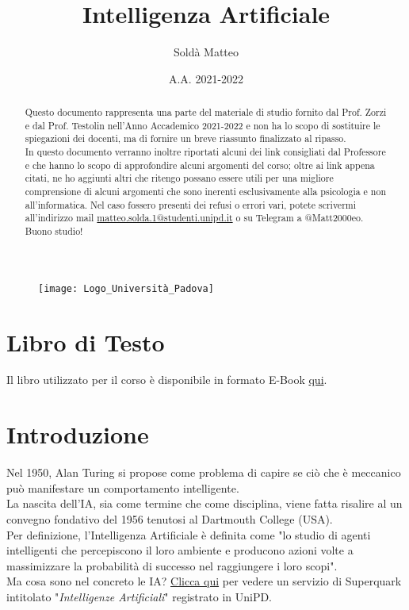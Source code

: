 \documentclass[12pt, a4paper]{article}
\title{Intelligenza Artificiale}
\author{Soldà Matteo }
\date{A.A. 2021-2022}
\begin{document}
\begin{figure}
    \centering
    \texttt{[image: Logo\_Università\_Padova]}
\end{figure}

\maketitle

\newpage
\begin{abstract}
    Questo documento rappresenta una parte del materiale di studio fornito dal Prof. Zorzi e dal Prof. Testolin nell'Anno Accademico 2021-2022 e non ha lo scopo di sostituire le spiegazioni dei docenti, ma di fornire un breve riassunto finalizzato al ripasso.\\ In questo documento verranno inoltre riportati alcuni dei link consigliati dal Professore e che hanno lo scopo di approfondire alcuni argomenti del corso; oltre ai link appena citati, ne ho aggiunti altri che ritengo possano essere utili per una migliore comprensione di alcuni argomenti che sono inerenti esclusivamente alla psicologia e non all'informatica.
    Nel caso fossero presenti dei refusi o errori vari, potete scrivermi all'indirizzo mail \href{mailto:matteo.solda.1@studenti.unipd.it}{matteo.solda.1@studenti.unipd.it} o su Telegram a @Matt2000eo.\\
    Buono studio!
\end{abstract}

\newpage
\tableofcontents

\newpage
\section{Libro di Testo}
Il libro utilizzato per il corso è disponibile in formato E-Book \href{https://infoscience.epfl.ch/record/63947}{qui}.

\section{Introduzione}
Nel 1950, Alan Turing si propose come problema di capire se ciò che è meccanico può manifestare un comportamento intelligente.\\
La nascita dell'IA, sia come termine che come disciplina, viene fatta risalire al un convegno fondativo del 1956 tenutosi al Dartmouth College (USA).\\
Per definizione, l'Intelligenza Artificiale è definita come "lo studio di agenti intelligenti che percepiscono il loro ambiente e producono azioni volte a massimizzare la probabilità di successo nel raggiungere i loro scopi". \\
Ma cosa sono nel concreto le IA? \href{https://www.raiplay.it/video/2018/08/Intelligenze-artificiali-29082018-f27a3b85-338c-46ba-97ae-2574c47a40a4.html}{Clicca qui} per vedere un servizio di Superquark intitolato "\textit{Intelligenze Artificiali}" registrato in UniPD.
\end{document}
